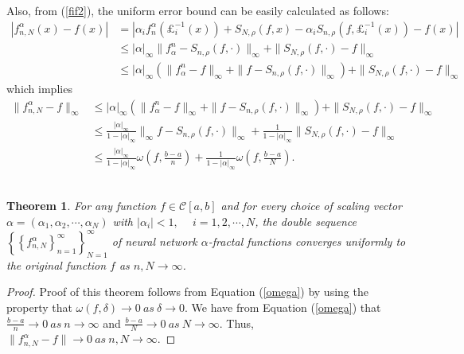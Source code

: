 \documentclass{article}[12pt, a4]
\newtheorem{theorem}{\large Theorem}[section]
\begin{document}
	Also, from (\ref{fif2}), the uniform error bound can be easily calculated as follows:
	\begin{align*}
		|f_{n, N}^{\alpha}(x)-f(x)|&=|\alpha_{i}f_{n}^{\alpha}(\pounds_{i}^{-1}(x))+S_{N,\rho}(f, x)-\alpha_{i}S_{n,\rho}(f, \pounds_{i}^{-1}(x))-f(x)|\\
		&\leq |\alpha|_\infty \|f_{\alpha}^{n}- S_{n,\rho}(f,\cdot)\|_{\infty}+\|S_{N,\rho}(f,\cdot)-f\|_{\infty}\\
		&\leq |\alpha|_\infty (\|f_{\alpha}^{n}-f\|_{\infty}+\|f- S_{n,\rho}(f,\cdot)\|_{\infty})+\|S_{N,\rho}(f,\cdot)-f\|_{\infty}
	\end{align*}
	which implies
	\begin{align}\label{omega}
		\|f_{n, N}^{\alpha}-f\|_{\infty}&\leq|\alpha|_\infty (\|f_{\alpha}^{n}-f\|_{\infty}+\|f- S_{n,\rho}(f,\cdot)\|_{\infty})+\|S_{N,\rho}(f,\cdot)-f\|_{\infty} \nonumber\\
		&\leq \frac{|\alpha|_\infty}{1-|\alpha|_\infty}\|_{\infty}f- S_{n,\rho}(f,\cdot)\|_{\infty}+\frac{1}{1-|\alpha|_\infty}\|S_{N,\rho}(f,\cdot)-f\|_{\infty}\nonumber\\
		&\leq  \frac{|\alpha|_\infty}{1-|\alpha|_\infty}\omega\left(f,\frac{b-a}{n}\right)+\frac{1}{1-|\alpha|_\infty}\omega\left(f, \frac{b-a}{N}\right).
	\end{align}\\
	
	\begin{theorem}\label{Thm5}
		For any function $f\in\mathcal{C}[a,b]$ and for every choice of scaling vector $\alpha=(\alpha_{1}, \alpha_{2}, \cdots, \alpha_{N})$ with $|\alpha_{i}|<1,~ \quad i =1,2,\cdots,N$, the double sequence $\left\{\left\{f_{n, N}^{\alpha}\right\}_{n=1}^{\infty}\right\}_{N=1}^{\infty}$ of neural network $\alpha$-fractal functions converges uniformly to the original function $f$ as $n, N\rightarrow \infty$.
	\end{theorem}
	
	\begin{proof}
		Proof of this theorem follows from Equation (\ref{omega}) by using the property that $\omega(f,\delta)\rightarrow0~ as~ \delta \rightarrow 0$. We have from Equation (\ref{omega}) that  $\frac{b-a}{n}\rightarrow 0~as~ n\rightarrow \infty$ and $\frac{b-a}{N}\rightarrow 0~as~ N \rightarrow \infty$. Thus, $\|f_{n, N}^{\alpha}-f\|\rightarrow 0~as~ n,N\rightarrow\infty$. 
	\end{proof} 
\end{document}
